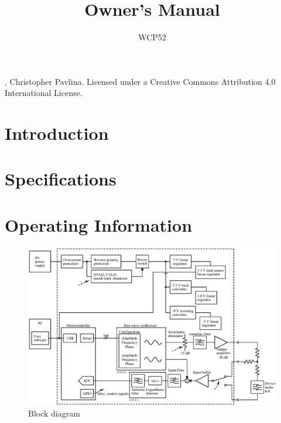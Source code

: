 \documentclass[article]{memoir}
\title{Owner's Manual}
\author{WCP52}
\begin{document}
\maketitle
\begin{center}
, Christopher Pavlina. Licensed under a Creative Commons Attribution 4.0 International License.
\end{center}

\begin{multicols}{2}

\tableofcontents
\listoffigures

\newpage
\chapter{Introduction}
\label{chap:intro}

\newpage
\chapter{Specifications}

\newpage
\chapter{Operating Information}


\end{multicols}
\newpage
\begin{figure}[H]
\centering
\includegraphics[width=6.5in]{blockdiagram}
\caption{Block diagram}
\label{fig:blockdiagram}
\end{figure}
\end{document}
